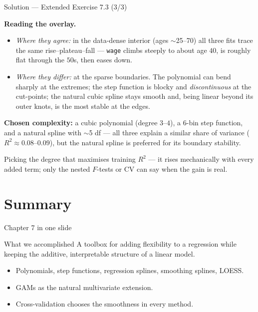 \documentclass[aspectratio=169,11pt]{beamer}
\begin{document}
\begin{frame}{Solution --- Extended Exercise 7.3 (3/3)}
\begin{solutionbox}
\textbf{Reading the overlay.}
\begin{itemize}
  \item \emph{Where they agree:} in the data-dense interior (ages $\sim$25--70) all three fits trace the same rise--plateau--fall --- \texttt{wage} climbs steeply to about age $40$, is roughly flat through the $50$s, then eases down.
  \item \emph{Where they differ:} at the sparse boundaries. The polynomial can bend sharply at the extremes; the step function is blocky and \emph{discontinuous} at the cut-points; the natural cubic spline stays smooth and, being linear beyond its outer knots, is the most stable at the edges.
\end{itemize}
\textbf{Chosen complexity:} a cubic polynomial (degree $3$--$4$), a $6$-bin step function, and a natural spline with $\sim$5 df --- all three explain a similar share of variance ($R^2\approx0.08$--$0.09$), but the natural spline is preferred for its boundary stability.
\end{solutionbox}
\begin{mistake}
Picking the degree that maximises training $R^2$ --- it rises mechanically with every added term; only the nested $F$-tests or CV can say when the gain is real.
\end{mistake}
\end{frame}



\section{Summary}

\begin{frame}{Chapter 7 in one slide}
  \begin{block}{What we accomplished}
    A toolbox for adding flexibility to a regression while keeping the
    additive, interpretable structure of a linear model.
  \end{block}
  \begin{itemize}
    \item Polynomials, step functions, regression splines, smoothing
          splines, LOESS.
    \item GAMs as the natural multivariate extension.
    \item Cross-validation chooses the smoothness in every method.
  \end{itemize}
\end{frame}
\end{document}
